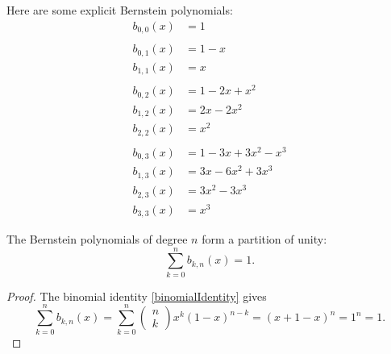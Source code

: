 \begin{example}
Here are some explicit Bernstein polynomials:
\begin{align*}
b_{0,0}(x) &= 1 \\
& \\
b_{0,1}(x) &= 1-x \\
b_{1,1}(x) &= x \\
& \\
b_{0,2}(x) &= 1 -2x + x^2 \\
b_{1,2}(x) &= 2x-2x^2 \\
b_{2,2}(x) &= x^2 \\
& \\
b_{0,3}(x) &= 1-3x+3x^2 - x^3 \\
b_{1,3}(x) &= 3x -6x^2 + 3x^3 \\
b_{2,3}(x) &= 3x^2 - 3x^3 \\
b_{3,3}(x) &= x^3
\end{align*}
\end{example}

\begin{lemma} \label{BernsteinPartitionUnity}
The Bernstein polynomials of degree $n$ form a partition of unity:
\[ \sum_{k=0}^n b_{k,n}(x) = 1. \]
\end{lemma}
\begin{proof}
The binomial identity \ref{binomialIdentity} gives
\[ \sum_{k=0}^n b_{k,n}(x) = \sum_{k=0}^n \begin{pmatrix}
n \\ k
\end{pmatrix}x^k(1-x)^{n-k} = (x+1-x)^n = 1^n = 1. \]
\end{proof}

